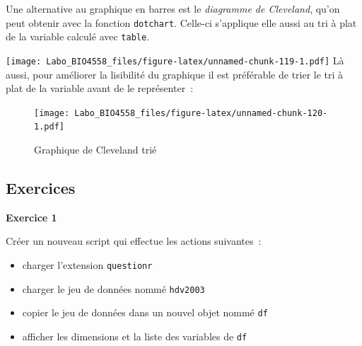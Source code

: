 \documentclass[
  12pt,
]{book}
\newenvironment{Shaded}{\begin{snugshade}}{\end{snugshade}}
\newcommand{\KeywordTok}[1]{\textcolor[rgb]{0.13,0.29,0.53}{\textbf{#1}}}
\newcommand{\NormalTok}[1]{#1}
\newcommand{\OperatorTok}[1]{\textcolor[rgb]{0.81,0.36,0.00}{\textbf{#1}}}
\providecommand{\tightlist}{%
  \setlength{\itemsep}{0pt}\setlength{\parskip}{0pt}}
\begin{document}
Une alternative au graphique en barres est le \emph{diagramme de Cleveland}, qu'on peut obtenir avec la fonction \texttt{dotchart}. Celle-ci s'applique elle aussi au tri à plat de la variable calculé avec \texttt{table}.

\begin{Shaded}
\end{Shaded}

\texttt{[image: Labo\_BIO4558\_files/figure-latex/unnamed-chunk-119-1.pdf]}
Là aussi, pour améliorer la lisibilité du graphique il est préférable de trier le tri à plat de la variable avant de le représenter~:

\begin{Shaded}
\end{Shaded}

\begin{figure}
\centering
\texttt{[image: Labo\_BIO4558\_files/figure-latex/unnamed-chunk-120-1.pdf]}
\caption{\label{fig:unnamed-chunk-120}Graphique de Cleveland trié}
\end{figure}

\hypertarget{ex-introR-univ}{%
\subsection{Exercices}\label{ex-introR-univ}}

\textbf{Exercice 1}

Créer un nouveau script qui effectue les actions suivantes~:

\begin{itemize}
\tightlist
\item
  charger l'extension \texttt{questionr}
\item
  charger le jeu de données nommé \texttt{hdv2003}
\item
  copier le jeu de données dans un nouvel objet nommé \texttt{df}
\item
  afficher les dimensions et la liste des variables de \texttt{df}
\end{itemize}
\end{document}
